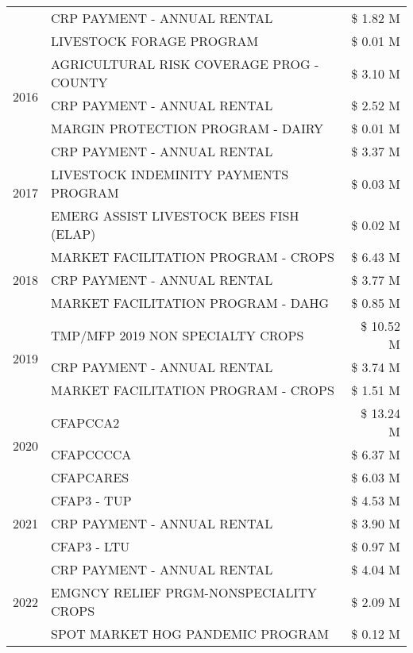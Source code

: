 \begin{tabular}{llr}
 & CRP PAYMENT - ANNUAL RENTAL & \$ 1.82 M \\
 & LIVESTOCK FORAGE PROGRAM & \$ 0.01 M \\
\cline{1-3}
\multirow[t]{3}{*}{2016} & AGRICULTURAL RISK COVERAGE PROG - COUNTY & \$ 3.10 M \\
 & CRP PAYMENT - ANNUAL RENTAL & \$ 2.52 M \\
 & MARGIN PROTECTION PROGRAM - DAIRY & \$ 0.01 M \\
\cline{1-3}
\multirow[t]{3}{*}{2017} & CRP PAYMENT - ANNUAL RENTAL & \$ 3.37 M \\
 & LIVESTOCK INDEMINITY PAYMENTS PROGRAM & \$ 0.03 M \\
 & EMERG ASSIST LIVESTOCK BEES FISH (ELAP) & \$ 0.02 M \\
\cline{1-3}
\multirow[t]{3}{*}{2018} & MARKET FACILITATION PROGRAM - CROPS & \$ 6.43 M \\
 & CRP PAYMENT - ANNUAL RENTAL & \$ 3.77 M \\
 & MARKET FACILITATION PROGRAM - DAHG & \$ 0.85 M \\
\cline{1-3}
\multirow[t]{3}{*}{2019} & TMP/MFP 2019 NON SPECIALTY CROPS & \$ 10.52 M \\
 & CRP PAYMENT - ANNUAL RENTAL & \$ 3.74 M \\
 & MARKET FACILITATION PROGRAM - CROPS & \$ 1.51 M \\
\cline{1-3}
\multirow[t]{3}{*}{2020} & CFAPCCA2 & \$ 13.24 M \\
 & CFAPCCCCA & \$ 6.37 M \\
 & CFAPCARES & \$ 6.03 M \\
\cline{1-3}
\multirow[t]{3}{*}{2021} & CFAP3 - TUP & \$ 4.53 M \\
 & CRP PAYMENT - ANNUAL RENTAL & \$ 3.90 M \\
 & CFAP3 - LTU & \$ 0.97 M \\
\cline{1-3}
\multirow[t]{3}{*}{2022} & CRP PAYMENT - ANNUAL RENTAL & \$ 4.04 M \\
 & EMGNCY RELIEF PRGM-NONSPECIALITY CROPS & \$ 2.09 M \\
 & SPOT MARKET HOG PANDEMIC PROGRAM & \$ 0.12 M \\
\cline{1-3}
\bottomrule
\end{tabular}
